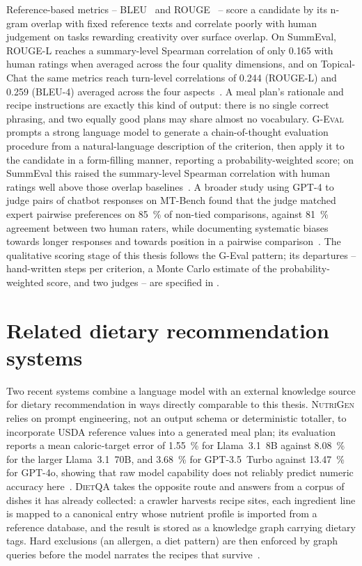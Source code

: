 Reference-based metrics -- \textsc{BLEU}~\cite{papineni2002bleu} and \textsc{ROUGE}~\cite{lin2004rouge} -- score a candidate by its n-gram overlap with fixed reference texts and correlate poorly with human judgement on tasks rewarding creativity over surface overlap. On SummEval, ROUGE-L reaches a summary-level Spearman correlation of only \num{0.165} with human ratings when averaged across the four quality dimensions, and on Topical-Chat the same metrics reach turn-level correlations of \num{0.244} (ROUGE-L) and \num{0.259} (BLEU-4) averaged across the four aspects~\cite{liu2023geval}. A meal plan's rationale and recipe instructions are exactly this kind of output: there is no single correct phrasing, and two equally good plans may share almost no vocabulary. \textsc{G-Eval} prompts a strong language model to generate a chain-of-thought evaluation procedure from a natural-language description of the criterion, then apply it to the candidate in a form-filling manner, reporting a probability-weighted score; on SummEval this raised the summary-level Spearman correlation with human ratings well above those overlap baselines~\cite{liu2023geval}. A broader study using GPT-4 to judge pairs of chatbot responses on MT-Bench found that the judge matched expert pairwise preferences on \qty{85}{\percent} of non-tied comparisons, against \qty{81}{\percent} agreement between two human raters, while documenting systematic biases towards longer responses and towards position in a pairwise comparison~\cite{zheng2023judging}. The qualitative scoring stage of this thesis follows the G-Eval pattern; its departures -- hand-written steps per criterion, a Monte Carlo estimate of the probability-weighted score, and two judges -- are specified in .

\section{Related dietary recommendation systems}
\label{sec:background-related-systems}

Two recent systems combine a language model with an external knowledge source for dietary recommendation in ways directly comparable to this thesis. \textsc{NutriGen} relies on prompt engineering, not an output schema or deterministic totaller, to incorporate USDA reference values into a generated meal plan; its evaluation reports a mean caloric-target error of \qty{1.55}{\percent} for Llama~3.1~8B against \qty{8.08}{\percent} for the larger Llama~3.1~70B, and \qty{3.68}{\percent} for GPT-3.5~Turbo against \qty{13.47}{\percent} for GPT-4o, showing that raw model capability does not reliably predict numeric accuracy here~\cite{khamesian2025nutrigen}. \textsc{DietQA} takes the opposite route and answers from a corpus of dishes it has already collected: a crawler harvests recipe sites, each ingredient line is mapped to a canonical entry whose nutrient profile is imported from a reference database, and the result is stored as a knowledge graph carrying dietary tags. Hard exclusions (an allergen, a diet pattern) are then enforced by graph queries before the model narrates the recipes that survive~\cite{tsampos2025dietqa}.

